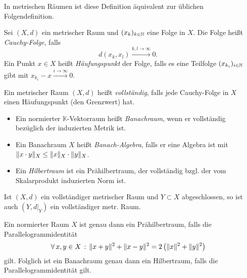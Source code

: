 \documentclass{cheat-sheet}
\newcommand{\K}{\mathbb{K}}
\newcommand{\convWith}[1]{\xrightarrow{#1 \to \infty}} %
\begin{document}
\begin{bem}
  In metrischen Räumen ist diese Definition äquivalent zur üblichen Folgendefinition.
\end{bem}

\begin{defn}
  Sei $(X, d)$ ein metrischer Raum und $(x_k)_{k \in \mathbb{N}}$ eine Folge in $X$. Die Folge heißt \emph{Cauchy-Folge}, falls
  \[ d(x_k, x_l) \convWith{k, l} 0. \]
  Ein Punkt $x \in X$ heißt \emph{Häufungspunkt} der Folge, falls es eine Teilfolge $(x_{k_i})_{i \in \mathbb{N}}$ gibt mit $x_{k_i} - x \convWith{i} 0$.
\end{defn}

\begin{defn}
  Ein metrischer Raum $(X, d)$ heißt \emph{vollständig}, falls jede Cauchy-Folge in $X$ einen Häufungspunkt (den Grenzwert) hat.
\end{defn}

\begin{defn}
  \begin{itemize}
    \item Ein normierter $\K$-Vektorraum heißt \emph{Banachraum}, wenn er vollständig bezüglich der induzierten Metrik ist.
    \item Ein Banachraum $X$ heißt \emph{Banach-Algebra}, falls er eine Algebra ist mit $\lVert x \cdot y\rVert_X \leq \lVert x\rVert_X \cdot \lVert y\rVert_X$.
    \item Ein \emph{Hilbertraum} ist ein Prähilbertraum, der vollständig bzgl. der vom Skalarprodukt induzierten Norm ist.
  \end{itemize}
\end{defn}

\begin{lem}
  Ist $(X, d)$ ein vollständiger metrischer Raum und $Y \subset X$ abgeschlossen, so ist auch $(Y, d|_Y)$ ein vollständiger metr. Raum.
\end{lem}


\begin{bem}
  Ein normierter Raum $X$ ist genau dann ein Prähilbertraum, falls die Parallelogrammidentität
  \[ \forall \, {x,y \in X} \,:\, \lVert x+y\rVert^2 + \lVert x-y\rVert^2 = 2 \left(\lVert x\rVert^2 + \lVert y\rVert^2\right) \]
  gilt. Folglich ist ein Banachraum genau dann ein Hilbertraum, falls die Parallelogrammidentität gilt.
\end{bem}

\end{document}
